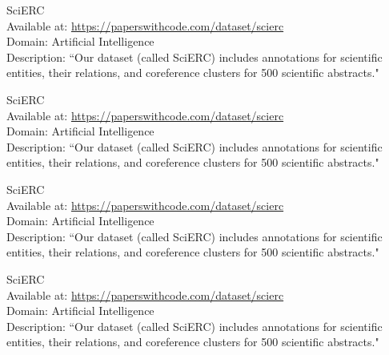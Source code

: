 \begin{dataset}
SciERC~\cite{DBLP:conf/emnlp/LuanHOH18}\\
Available at: \url{https://paperswithcode.com/dataset/scierc}\\
Domain: Artificial Intelligence\\
Description: ``Our dataset (called SciERC) includes annotations for scientific entities, their relations, and coreference clusters for 500 scientific abstracts."~\cite{DBLP:conf/emnlp/LuanHOH18}
\label{dataset:scierc12}
\end{dataset}
\begin{dataset}
SciERC~\cite{DBLP:conf/emnlp/LuanHOH18}\\
Available at: \url{https://paperswithcode.com/dataset/scierc}\\
Domain: Artificial Intelligence\\
Description: ``Our dataset (called SciERC) includes annotations for scientific entities, their relations, and coreference clusters for 500 scientific abstracts."~\cite{DBLP:conf/emnlp/LuanHOH18}
\label{dataset:scierc13}
\end{dataset}
\begin{dataset}
SciERC~\cite{DBLP:conf/emnlp/LuanHOH18}\\
Available at: \url{https://paperswithcode.com/dataset/scierc}\\
Domain: Artificial Intelligence\\
Description: ``Our dataset (called SciERC) includes annotations for scientific entities, their relations, and coreference clusters for 500 scientific abstracts."~\cite{DBLP:conf/emnlp/LuanHOH18}
\label{dataset:scierc14}
\end{dataset}
\begin{dataset}
SciERC~\cite{DBLP:conf/emnlp/LuanHOH18}\\
Available at: \url{https://paperswithcode.com/dataset/scierc}\\
Domain: Artificial Intelligence\\
Description: ``Our dataset (called SciERC) includes annotations for scientific entities, their relations, and coreference clusters for 500 scientific abstracts."~\cite{DBLP:conf/emnlp/LuanHOH18}
\label{dataset:scierc15}
\end{dataset}
